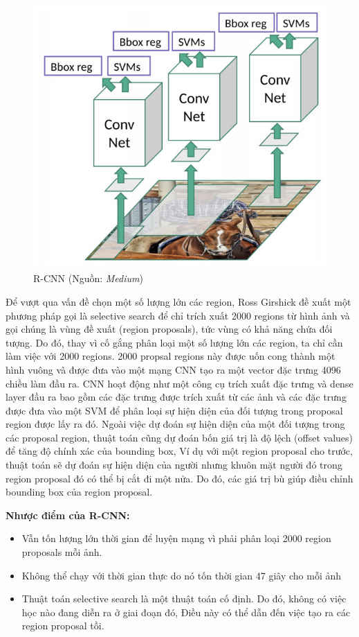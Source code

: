 \documentclass[a4paper, 12pt]{report}
\begin{document}
\begin{figure}[!h]
	\centering
	\includegraphics[width=0.45\linewidth]{Images/rcnn1}
	\caption{R-CNN (Nguồn: \textit{Medium})}
	\label{fig:rcnn1}
\end{figure}

Để vượt qua vấn đề chọn một số lượng lớn các region, Ross Girshick đề xuất một phương pháp gọi là selective search để chỉ trích xuất 2000 regions từ hình ảnh và gọi chúng là vùng đề xuất (region proposals), tức vùng có khả năng chứa đối tượng. Do đó, thay vì cố gắng phân loại một số lượng lớn các region, ta chỉ cần làm việc với 2000 regions. 2000 propsal regions này được uốn cong thành một hình vuông và được đưa vào một mạng CNN tạo ra một vector đặc trưng 4096 chiều làm đầu ra. CNN hoạt động như một công cụ trích xuất đặc trưng và dense layer đầu ra bao gồm các đặc trưng được trích xuất từ các ảnh và các đặc trưng được đưa vào một SVM để phân loại sự hiện diện của đối tượng trong proposal region được lấy ra đó. Ngoài việc dự đoán sự hiện diện của một đối tượng trong các proposal region, thuật toán cũng dự đoán bốn giá trị là độ lệch (offset values) để tăng độ chính xác của bounding box, Ví dụ với một region proposal cho trước, thuật toán sẽ dự đoán sự hiện diện của người nhưng khuôn mặt người đó trong region proposal đó có thể bị cắt đi một nửa. Do đó, các giá trị bù giúp điều chỉnh bounding box của region proposal.\par
\textbf{Nhược điểm của R-CNN:}
\begin{itemize}
	\item Vẫn tốn lượng lớn thời gian để luyện mạng vì phải phân loại 2000 region proposals mỗi ảnh.
	\item Không thể chạy với thời gian thực do nó tốn thời gian 47 giây cho mỗi ảnh
	\item Thuật toán selective search là một thuật toán cố định. Do đó, không có việc học nào đang diễn ra ở giai đoạn đó, Điều này có thể dẫn đến việc tạo ra các region proposal tồi.
\end{itemize}
\end{document}
